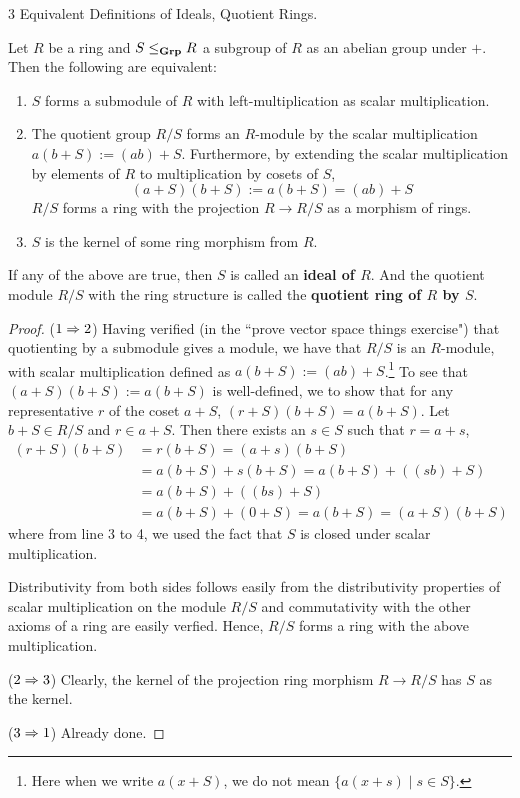 \documentclass[../../book.tex]{subfiles}
\begin{document}
\begin{dfn} 3 Equivalent Definitions of Ideals, Quotient Rings. 

    Let $R$ be a ring and $S \leq_{\mathbf{Grp}} R$ a subgroup of $R$ as an abelian group
    under $+$. 
    Then the following are equivalent: 
    \begin{enumerate}
        \item $S$ forms a submodule of $R$ with 
        left-multiplication as scalar multiplication.
        \item The quotient group $R/S$ forms an $R$-module by
        the scalar multiplication $a(b + S) := (ab) + S$. 
        Furthermore, by extending the scalar multiplication by elements of $R$ to
        multiplication by cosets of $S$, 
        \[(a + S)(b + S) := a(b + S) = (ab) + S\]
        $R/S$ forms a ring with the projection $R \to R/S$ as a morphism of rings.
        \item $S$ is the kernel of some ring morphism from $R$. 
    \end{enumerate}
    If any of the above are true, then $S$ is called an \textbf{ideal of $R$}. 
    And the quotient module $R/S$ with the ring structure is called 
    the \textbf{quotient ring of $R$ by $S$}. 
\end{dfn}
\begin{proof}
    ($1 \Rightarrow 2$)
        Having verified (in the ``prove vector space things exercise") 
        that quotienting by a submodule gives a module,
        we have that $R/S$ is an $R$-module,
        with scalar multiplication defined as $a (b + S) := (ab) + S$.\footnote{
        Here when we write $a (x +S)$, 
        we do not mean $\{a(x+s) \mid s \in S\}$.}
        To see that $(a + S)(b + S) := a(b + S)$ is well-defined, 
        we to show that for any representative $r$ of the coset $a + S$, 
        $(r + S)(b + S) = a(b + S)$.
        Let $b + S \in R/S$ and  $r \in a + S$.
        Then there exists an $s \in S$ such that $r = a + s$,
        \begin{align*}
            (r + S)(b + S) &= r(b + S) = (a + s)(b + S) \\
            &= a (b + S) + s (b + S) = a(b + S) + ((sb) + S) \\
            &= a(b + S) + ((bs) + S) \\
            &= a(b + S) + (0 + S) = a(b + S) = (a + S)(b + S)
        \end{align*}
        where from line 3 to 4, we used the fact that 
        $S$ is closed under scalar multiplication. 
        
        Distributivity from both sides follows easily from
        the distributivity properties of scalar multiplication on the module $R/S$
        and commutativity with the other axioms of a ring are easily verfied.
        Hence, $R/S$ forms a ring with the above multiplication. 
        
    ($2 \Rightarrow 3$)
        Clearly, the kernel of the projection ring morphism $R \to R/S$
        has $S$ as the kernel. 
        
    ($3 \Rightarrow 1$)
        Already done.
\end{proof}
\end{document}
